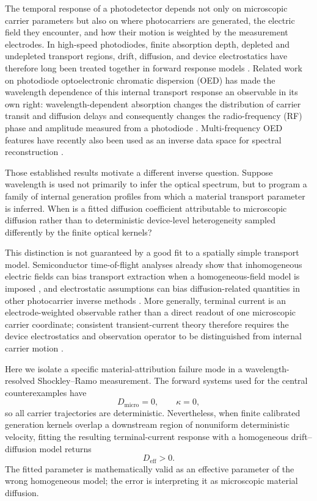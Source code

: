 \documentclass[aps,pra,twocolumn,superscriptaddress,nofootinbib]{revtex4-2}
\newcommand{\Deff}{D_{\mathrm{eff}}}
\newcommand{\Dmicro}{D_{\mathrm{micro}}}
\begin{document}
The temporal response of a photodetector depends not only on microscopic carrier parameters but also on where photocarriers are generated, the electric field they encounter, and how their motion is weighted by the measurement electrodes. In high-speed photodiodes, finite absorption depth, depleted and undepleted transport regions, drift, diffusion, and device electrostatics have therefore long been treated together in forward response models \cite{hu2015pda}. Related work on photodiode optoelectronic chromatic dispersion (OED) has made the wavelength dependence of this internal transport response an observable in its own right: wavelength-dependent absorption changes the distribution of carrier transit and diffusion delays and consequently changes the radio-frequency (RF) phase and amplitude measured from a photodiode \cite{glasser2021oed,liokumovitch2021germanium,liokumovitch2022femtometer,dutta2024pin,mudgal2024pn}. Multi-frequency OED features have recently also been used as an inverse data space for spectral reconstruction \cite{kassa2026spectroscopy}.

Those established results motivate a different inverse question. Suppose wavelength is used not primarily to infer the optical spectrum, but to program a family of internal generation profiles from which a material transport parameter is inferred. When is a fitted diffusion coefficient attributable to microscopic diffusion rather than to deterministic device-level heterogeneity sampled differently by the finite optical kernels?

This distinction is not guaranteed by a good fit to a spatially simple transport model. Semiconductor time-of-flight analyses already show that inhomogeneous electric fields can bias transport extraction when a homogeneous-field model is imposed \cite{emelianova2006tof}, and electrostatic assumptions can bias diffusion-related quantities in other photocarrier inverse methods \cite{hattori1992sspg}. More generally, terminal current is an electrode-weighted observable rather than a direct readout of one microscopic carrier coordinate; consistent transient-current theory therefore requires the device electrostatics and observation operator to be distinguished from internal carrier motion \cite{hawks2015current}.

Here we isolate a specific material-attribution failure mode in a wavelength-resolved Shockley--Ramo measurement. The forward systems used for the central counterexamples have
\begin{equation}
\Dmicro=0,
\qquad
\kappa=0,
\end{equation}
so all carrier trajectories are deterministic. Nevertheless, when finite calibrated generation kernels overlap a downstream region of nonuniform deterministic velocity, fitting the resulting terminal-current response with a homogeneous drift--diffusion model returns
\begin{equation}
\Deff>0.
\end{equation}
The fitted parameter is mathematically valid as an effective parameter of the wrong homogeneous model; the error is interpreting it as microscopic material diffusion.
\end{document}
